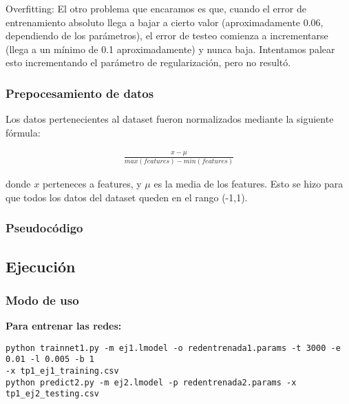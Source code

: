 Overfitting: El otro problema que encaramos es que, cuando el error de entrenamiento absoluto llega a bajar a cierto valor (aproximadamente 0.06, dependiendo de los parámetros), 
el error de testeo comienza a incrementarse (llega a un mínimo de 0.1 aproximadamente) y nunca baja. Intentamos palear esto incrementando el parámetro de regularización, pero no resultó.

\subsubsection{Prepocesamiento de datos}

Los datos pertenecientes al dataset fueron normalizados mediante la siguiente fórmula: 

\begin{align*}
		\frac{x - \mu}{max(features) - min(features)} 
\end{align*}

donde $x$ perteneces a features, y $\mu$ es la media de los features. Esto se hizo para que todos los datos  del dataset queden en el rango (-1,1).

\subsubsection{Pseudocódigo}


\subsection{Ejecución}

\subsubsection{Modo de uso}

\textbf{Para entrenar las redes:}

\noindent\texttt{\scriptsize{python trainnet1.py -m ej1.lmodel -o redentrenada1.params -t 3000 -e 0.01 -l 0.005 -b 1}} \\

\texttt{\scriptsize{-x tp1\_ej1\_training.csv}} \\

\noindent\texttt{\scriptsize{python predict2.py -m ej2.lmodel -p redentrenada2.params -x tp1\_ej2\_testing.csv}} \\





